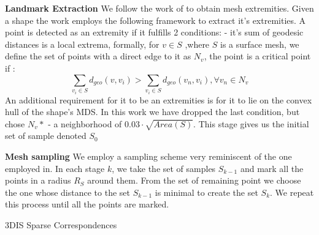 \documentclass[10pt,twocolumn,letterpaper]{article}
\begin{document}
\textbf{Landmark Extraction}
We follow the work of\cite{katz2005mesh} to obtain mesh extremities. Given a shape the work employs the following framework to extract it's extremities. A point is detected as an extremity if it fulfills 2 conditions: - it's sum of geodesic distances is a local extrema, formally, for $v\in S$ ,where $S$ is a surface mesh, we define the set of points with a direct edge to it as $N_v$, the point is a critical point if :
\begin{equation}
\sum_{v_i\in S}d_{geo}(v,v_i)>\sum_{v_i\in S}d_{geo}(v_n,v_i), \forall v_n\in N_v
\end{equation}
An additional requirement for it to be an extremities is for it to lie on the convex hull of the shape's MDS. In this work we have dropped the last condition, but chose $N_v*$ - a neighborhood of $0.03\cdot \sqrt{Area(S)}$. This stage gives us the initial set of sample denoted $S_0$

\textbf{Mesh sampling}
We employ a sampling scheme very reminiscent of the one employed in\cite{sahillioǧlu2011coarse}. In each stage $k$, we take the set of samples $S_{k-1}$ and mark all the points in a radius $R_S$ around them. From the set of remaining point we choose the one whose distance to the set $S_{k-1}$ is minimal to create the set $S_k$. We repeat this process until all the points are marked.

\begin{algorithm}[h]
	\caption{3DIS Sparse Correspondences}
	\begin{algorithmic}
		 
		\EndFor
		\EndProcedure
	\end{algorithmic}
\end{algorithm}
\end{document}
